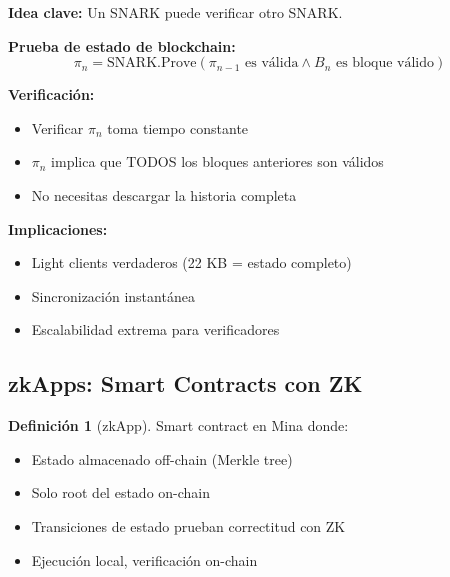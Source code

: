 \documentclass[11pt,a4paper,twoside]{book}
\theoremstyle{definition}
\newtheorem{definition}{Definición}[chapter]
\theoremstyle{remark}
\begin{document}
\begin{mathnote}
\textbf{Idea clave:} Un SNARK puede verificar otro SNARK.

\textbf{Prueba de estado de blockchain:}
\[
\pi_{n} = \text{SNARK.Prove}\left(
\pi_{n-1} \text{ es válida} \land B_n \text{ es bloque válido}
\right)
\]

\textbf{Verificación:}
\begin{itemize}
    \item Verificar $\pi_n$ toma tiempo constante
    \item $\pi_n$ implica que TODOS los bloques anteriores son válidos
    \item No necesitas descargar la historia completa
\end{itemize}

\textbf{Implicaciones:}
\begin{itemize}
    \item Light clients verdaderos (22 KB = estado completo)
    \item Sincronización instantánea
    \item Escalabilidad extrema para verificadores
\end{itemize}
\end{mathnote}

\subsection{zkApps: Smart Contracts con ZK}

\begin{definition}[zkApp]
Smart contract en Mina donde:
\begin{itemize}
    \item Estado almacenado off-chain (Merkle tree)
    \item Solo root del estado on-chain
    \item Transiciones de estado prueban correctitud con ZK
    \item Ejecución local, verificación on-chain
\end{itemize}
\end{definition}
\end{document}
